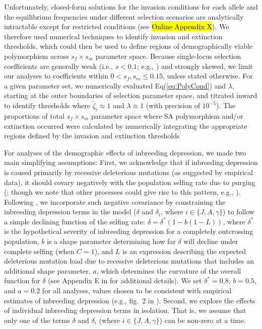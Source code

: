 \documentclass[11pt]{article}
\begin{document}
Unfortunately, closed-form solutions for the invasion conditions for each allele and the equilibrium frequencies under different selection scenarios are analytically intractable except for restricted conditions (see \hl{Online Appendix X}). We therefore used numerical techniques to identify invasion and extinction thresholds, which could then be used to define regions of demographically viable polymorphism across $s_f \times s_m$ parameter space. Because single-locus selection coefficients are generally weak (i.e., $s < 0.1$; e.g., \citealt{Eyre-WalkerKeightly2007}) and strongly skewed, we limit our analyses to coefficients within $0 < s_f,s_m \leq 0.15$, unless stated otherwise. For a given parameter set, we numerically evaluated Eq(\ref{eq:PolyCond}) and $\lambda$, starting at the outer boundaries of selection parameter space, and titrated inward to identify thresholds where $\tilde{\zeta}_i \approx 1$ and $\lambda \approx 1$ (with precision of $10^{-5}$). The proportions of total $s_f \times s_m$ parameter space where SA polymorphism and/or extinction occurred were calculated by numerically integrating the appropriate regions defined by the invasion and extinction thresholds

For analyses of the demographic effects of inbreeding depression, we made two main simplifying assumptions: First, we acknowledge that if inbreeding depression is caused primarily by recessive deleterious mutations (as suggested by empirical data), it should covary negatively with the population selfing rate due to purging (\citealt{Charlesworth2009}; though we note that other processes could give rise to this pattern, e.g., \citealt{CrnokrakBarrett2002, Charlesworth2009,HedrickGarcia-Dorado2016}). Following \citet{Olito2019}, we incorporate such negative covariance by constraining the inbreeding depression terms in the model ($\delta$ and $\delta_i$, where $i \in \{J,A,\gamma\}$) to follow a simple declining function of the selfing rate: $\delta = \delta^{\ast} (1 - b (1 - L))$, where $\delta^{\ast}$ is the hypothetical severity of inbreeding depression for a completely outcrossing population, $b$ is a shape parameter determining how far $\delta$ will decline under complete selfing (when $C = 1$), and $L$ is an expression describing the expected deleterious mutation load due to recessive deleterious mutations that includes an additional shape parameter, $a$, which determines the curvature of the overall function for $\delta$ (see Appendix E in \citealt{Olito2019} for additional details). We set $\delta^{\ast} = 0.8$, $b = 0.5$, and $a = 0.2$ for all analyses, values chosen to be consistent with empirical estimates of inbreeding depression (e.g., fig.~2 in \citealt{HusbandSchemske1996}). Second, we explore the effects of individual inbreeding depression terms in isolation. That is, we assume that only one of the terms $\delta$ and $\delta_i$ (where $i \in \{J,A,\gamma\}$) can be non-zero at a time. 
\end{document}
